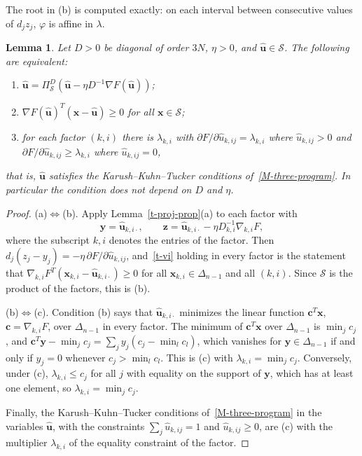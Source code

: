 \documentclass[11pt]{article}
\theoremstyle{plain}
\newtheorem{lemma}[theorem]{Lemma}
\theoremstyle{remark}
\numberwithin{equation}{section}
\begin{document}
The root in (b) is computed exactly: on each interval between consecutive
values of $d_jz_j$, $\varphi$ is affine in $\lambda$.

\begin{lemma}\label{t-fixed}
Let $D>0$ be diagonal of order $3N$, $\eta>0$, and
$\widehat{\bm u}\in\mathcal{S}$. The following are equivalent:
\begin{enumerate}
\item[(a)] $\widehat{\bm u}=\Pi^D_{\mathcal{S}}\left(\widehat{\bm u}-\eta D^{-1}\nabla F\left(\widehat{\bm u}\right)\right)$;
\item[(b)] $\nabla F\left(\widehat{\bm u}\right)^T\left(\bm x-\widehat{\bm u}\right)\ge 0$ for all $\bm x\in\mathcal{S}$;
\item[(c)] for each factor $(k,i)$ there is $\lambda_{k,i}$ with
$\partial F/\partial\widehat u_{k,ij}=\lambda_{k,i}$ where $\widehat u_{k,ij}>0$
and $\partial F/\partial\widehat u_{k,ij}\ge\lambda_{k,i}$ where $\widehat u_{k,ij}=0$,
\end{enumerate}
that is, $\widehat{\bm u}$ satisfies the Karush--Kuhn--Tucker conditions
of~\eqref{M-three-program}. In particular the condition does not depend on $D$
and $\eta$.
\end{lemma}
\begin{proof}
(a)$\Leftrightarrow$(b). Apply Lemma~\ref{t-proj-prop}(a) to each factor
with
\begin{equation*}
\bm y=\widehat{\bm u}_{k,i\cdot},\qquad
\bm z=\widehat{\bm u}_{k,i\cdot}-\eta D_{k,i}^{-1}\nabla_{k,i}F,
\end{equation*}
where the subscript $k,i$ denotes the entries of the factor. Then
$d_j(z_j-y_j)=-\eta\,\partial F/\partial\widehat u_{k,ij}$, and~\eqref{t-vi}
holding in every factor is the statement that
$\nabla_{k,i}F^T(\bm x_{k,i}-\widehat{\bm u}_{k,i\cdot})\ge 0$ for all
$\bm x_{k,i}\in\Delta_{n-1}$ and all $(k,i)$. Since $\mathcal{S}$ is the
product of the factors, this is (b).

(b)$\Leftrightarrow$(c). Condition (b) says that $\widehat{\bm u}_{k,i\cdot}$
minimizes the linear function $\bm c^T\bm x$, $\bm c=\nabla_{k,i}F$, over
$\Delta_{n-1}$ in every factor. The minimum of $\bm c^T\bm x$ over
$\Delta_{n-1}$ is $\min_jc_j$, and
$\bm c^T\bm y-\min_jc_j=\sum_jy_j\left(c_j-\min_lc_l\right)$, which vanishes for
$\bm y\in\Delta_{n-1}$ if and only if $y_j=0$ whenever $c_j>\min_lc_l$. This
is (c) with $\lambda_{k,i}=\min_jc_j$. Conversely, under (c),
$\lambda_{k,i}\le c_j$ for all $j$ with equality on the support of $\bm y$,
which has at least one element, so $\lambda_{k,i}=\min_jc_j$.

Finally, the Karush--Kuhn--Tucker conditions of~\eqref{M-three-program} in the
variables $\widehat{\bm u}$, with the constraints $\sum_j\widehat u_{k,ij}=1$
and $\widehat u_{k,ij}\ge 0$, are (c) with the multiplier $\lambda_{k,i}$ of
the equality constraint of the factor.
\end{proof}
\end{document}

